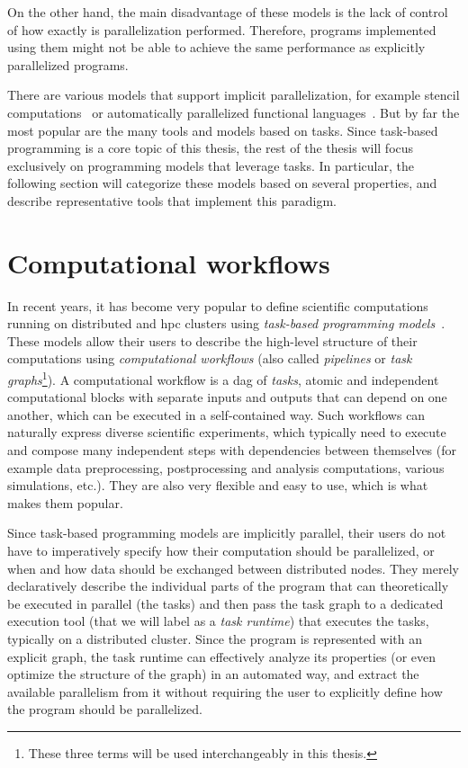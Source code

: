 On the other hand, the main disadvantage of these models is the lack of control of how exactly is
parallelization performed. Therefore, programs implemented using them might not be able to achieve
the same performance as explicitly parallelized programs.

There are various models that support implicit parallelization, for example stencil
computations~\cite{stencil} or automatically parallelized functional
languages~\cite{parallel_haskell}. But by far the most popular are the many tools and models based
on tasks. Since task-based programming is a core topic of this thesis, the rest of the thesis will
focus exclusively on programming models that leverage tasks. In particular, the following section
will categorize these models based on several properties, and describe representative tools that
implement this paradigm.

\section{Computational workflows}
In recent years, it has become very popular to define scientific computations running on
distributed and \gls{hpc} clusters using
\emph{task-based programming models}~\cite{pegasus,workflows1,workflows_at_scale}. These models allow their users to describe the
high-level structure of their computations using \emph{computational workflows} (also called \emph{pipelines} or \emph{task graphs}\footnote{These three terms will be used interchangeably in this thesis.}). A computational workflow
is a \gls{dag} of \emph{tasks}, atomic and independent computational
blocks with separate inputs and outputs that can depend on one another, which can be executed in a
self-contained way. Such workflows can naturally express diverse scientific experiments, which
typically need to execute and compose many independent steps with dependencies between themselves
(for example data preprocessing, postprocessing and analysis computations, various simulations,
etc.). They are also very flexible and easy to use, which is what makes them popular.

Since task-based programming models are implicitly parallel, their users do not have to
imperatively specify how their computation should be parallelized, or when and how data should be
exchanged between distributed nodes. They merely declaratively describe the individual parts of the
program that can theoretically be executed in parallel (the tasks) and then pass the task graph to
a dedicated execution tool (that we will label as a \emph{task runtime}) that executes the
tasks, typically on a distributed cluster. Since the program is represented with an explicit graph,
the task runtime can effectively analyze its properties (or even optimize the structure of the
graph) in an automated way, and extract the available parallelism from it without requiring the
user to explicitly define how the program should be parallelized.

